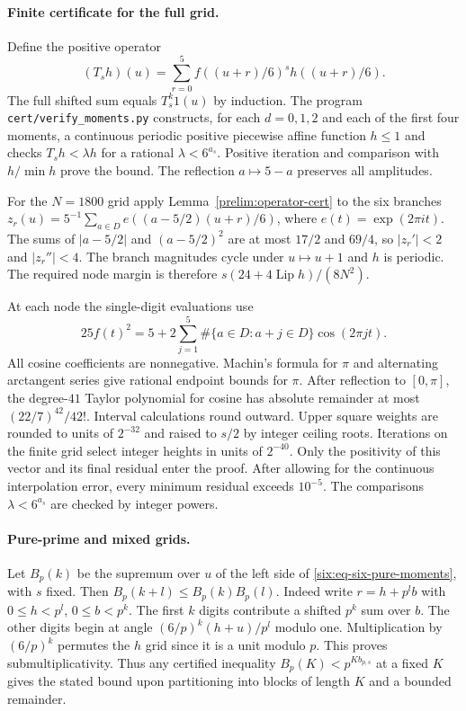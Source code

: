 \documentclass[11pt,a4paper]{article}
\theoremstyle{paperplain}
\numberwithin{equation}{section}
\begin{document}
\paragraph{Finite certificate for the full grid.}
Define the positive operator
\[
 (T_sh)(u)=\sum_{r=0}^5 f((u+r)/6)^s h((u+r)/6).
\]
The full shifted sum equals $T_s^k1(u)$ by induction. The program
\texttt{cert/verify\_moments.py} constructs, for each $d=0,1,2$
and each of the first four moments, a continuous periodic positive
piecewise affine function $h\le1$ and checks
$T_sh<\lambda h$ for a rational $\lambda<6^{a_s}$.
Positive iteration and comparison with $h/\min h$ prove the bound.
The reflection $a\mapsto5-a$ preserves all amplitudes.

For the $N=1800$ grid apply Lemma~\ref{prelim:operator-cert} to the six
branches $z_r(u)=5^{-1}\sum_{a\in D}e((a-5/2)(u+r)/6)$, where
$e(t)=\exp(2\pi it)$. The sums of $|a-5/2|$ and $(a-5/2)^2$ are at
most $17/2$ and $69/4$, so $|z_r'|<2$ and $|z_r''|<4$.
The branch magnitudes cycle under $u\mapsto u+1$ and $h$ is periodic.
The required node margin is therefore $s(24+4\operatorname{Lip}h)/(8N^2)$.

At each node the single-digit evaluations use
\[
 25 f(t)^2
 =5+2\sum_{j=1}^5\#\{a\in D:a+j\in D\}\cos(2\pi jt).
\]
All cosine coefficients are nonnegative. Machin's formula for $\pi$
and alternating arctangent series give rational endpoint bounds for
$\pi$. After reflection to $[0,\pi]$, the degree-$41$ Taylor
polynomial for cosine has absolute remainder at most
$(22/7)^{42}/42!$. Interval calculations round outward. Upper square
weights are rounded to units of $2^{-32}$ and raised to $s/2$ by
integer ceiling roots. Iterations on the finite grid select integer
heights in units of $2^{-40}$. Only the positivity of this vector and
its final residual enter the proof. After allowing for the continuous
interpolation error, every minimum residual exceeds $10^{-5}$.
The comparisons $\lambda<6^{a_s}$ are checked by integer powers.

\paragraph{Pure-prime and mixed grids.}
Let $B_p(k)$ be the supremum over $u$ of the left side of
\eqref{six:eq-six-pure-moments}, with $s$ fixed. Then
$B_p(k+l)\le B_p(k)B_p(l)$. Indeed write $r=h+p^l b$ with
$0\le h<p^l$, $0\le b<p^k$. The first $k$ digits contribute a
shifted $p^k$ sum over $b$. The other digits begin at angle
$(6/p)^k(h+u)/p^l$ modulo one. Multiplication by $(6/p)^k$
permutes the $h$ grid since it is a unit modulo $p$. This proves
submultiplicativity. Thus any certified inequality
$B_p(K)<p^{K b_{p,s}}$ at a fixed $K$ gives the stated bound upon
partitioning into blocks of length $K$ and a bounded remainder.
\end{document}
